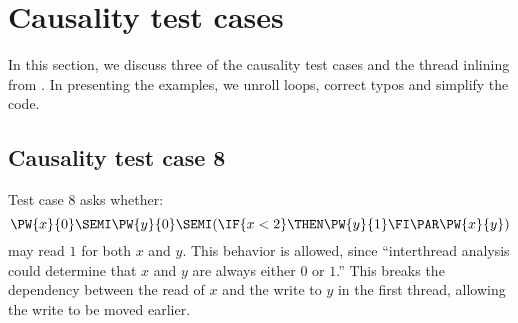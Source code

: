 \section{Causality test cases}
\label{sec:examples}

In this section, we discuss three of the causality test cases and the thread
inlining from \cite{Manson:2005:JMM:1047659.1040336}.  In presenting the
examples, we unroll loops, correct typos and simplify the code.  

\subsection{Causality test case 8}

\begin{comment}
Consider the program variant:

x=0; r=x; if(r<2){y=1} || x=5

[[ y=1 ]] contains (Wy1)

[[ if(r<2){y=1} ]] contains (r<2|Wy1)

[[ r=x; if(r<2){y=1} ]] contains (Rx5)  (x<2|Wy1)  //with no order

[[ x=0; r=x; if(r<2){y=1} ]] contains (Wx0)  (Rx5)  (x<2|Wy1) //does not work, since violates (6a) 𝜆Φ′(𝑒) implies 𝜆Φ(𝑒)[𝑣/𝑥].
 

Another example:
So consider the single threaded program

x=4; x=5; r=x; if(r==4){y=1}

Clearly, this should not be able to give us Wy1.
Here is why that is not possible:

[[ y=1 ]] contains (Wy1)

[[ if(r==4){y=1} ]] contains (r==4|Wy1)

[[ r=x; if(r==4){y=1} ]] contains (Rx5)  (x==4|Wy1) // with no order

[[ x=5; r=x; if(r==4){y=1} ]] contains (Wx5)-->(Rx5)  (5==4|Wy1) // 5 is forced.
\end{comment}

Test case 8 asks whether:
\begin{displaymath}
   \PW{x}{0}\SEMI
   \PW{y}{0}\SEMI
  (\IF{x<2}\THEN \PW{y}{1}\FI 
  \PAR
  \PW{x}{y})
\end{displaymath}
may read $1$ for both $x$ and $y$.  This behavior is allowed, since
``interthread analysis could determine that $x$ and $y$ are always either $0$
or $1$.''  This breaks the dependency between the read of $x$ and the write
to $y$ in the first thread, allowing the write to be moved earlier.


